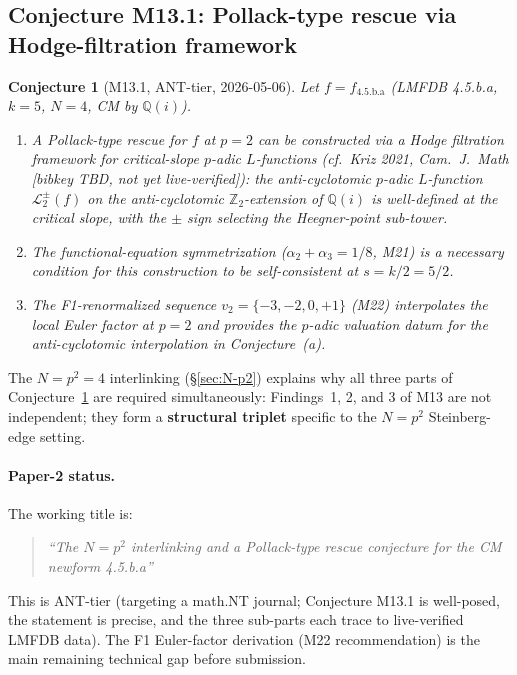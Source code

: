\documentclass[a4paper,11pt]{article}
\newcommand{\fLM}{f_{\text{4.5.b.a}}}
\newcommand{\Qi}{\mathbb{Q}(i)}
\newtheorem{conjecture}[theorem]{Conjecture}
\theoremstyle{definition}
\theoremstyle{remark}
\begin{document}
\subsection{Conjecture M13.1: Pollack-type rescue via Hodge-filtration framework}

\begin{conjecture}[M13.1, ANT-tier, 2026-05-06]
\label{conj:M13.1}
Let $f=\fLM$ (LMFDB 4.5.b.a, $k=5$, $N=4$, CM by $\Qi$).
\begin{enumerate}
  \item[(a)] A \emph{Pollack-type rescue} for $f$ at $p=2$ can be
    constructed via a Hodge filtration framework for critical-slope
    $p$-adic $L$-functions (cf.\ Kriz 2021, \emph{Cam.\ J.\ Math}
    [bibkey TBD, not yet live-verified]):
    the anti-cyclotomic $p$-adic $L$-function
    $\mathcal{L}_2^{\pm}(f)$ on the anti-cyclotomic $\mathbb{Z}_2$-extension
    of $\Qi$ is well-defined at the critical slope, with the
    $\pm$ sign selecting the Heegner-point sub-tower.
  \item[(b)] The functional-equation symmetrization ($\alpha_2+\alpha_3=1/8$,
    M21) is a necessary condition for this construction
    to be self-consistent at $s=k/2=5/2$.
  \item[(c)] The F1-renormalized sequence $v_2=\{-3,-2,0,+1\}$
    (M22) interpolates the local Euler factor at $p=2$ and
    provides the $p$-adic valuation datum for the
    anti-cyclotomic interpolation in Conjecture~(a).
\end{enumerate}
\end{conjecture}

\noindent The $N=p^2=4$ interlinking (\S\ref{sec:N-p2}) explains
why all three parts of Conjecture~\ref{conj:M13.1} are required
simultaneously: Findings~1, 2, and 3 of M13 are not independent;
they form a \textbf{structural triplet} specific to the
$N=p^2$ Steinberg-edge setting.

\paragraph{Paper-2 status.}  The working title is:
\begin{quote}\itshape
``The $N=p^2$ interlinking and a Pollack-type rescue conjecture
for the CM newform 4.5.b.a''
\end{quote}
This is ANT-tier (targeting a math.NT journal; Conjecture
M13.1 is well-posed, the statement is precise, and the three
sub-parts each trace to live-verified LMFDB data).  The
F1 Euler-factor derivation (M22 recommendation) is the main
remaining technical gap before submission.
\end{document}
